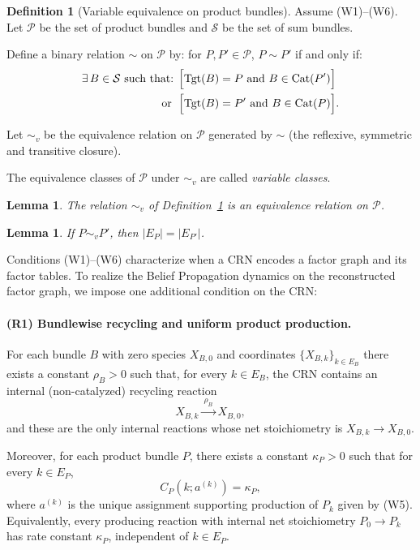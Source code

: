 \documentclass{article}
\theoremstyle{plain}
\newtheorem{lemma}[theorem]{Lemma}
\theoremstyle{definition}
\newtheorem{definition}[theorem]{Definition}
\theoremstyle{remark}
\newcommand{\Cat}{\textrm{Cat}}
\newcommand{\<}{\langle}
\newcommand{\tgt}{\textrm{Tgt}}
\renewcommand{\>}{\rangle}
\begin{document}
\begin{definition}[Variable equivalence on product bundles]\label{def:variable-equivalence}
Assume (W1)--(W6). Let $\mathcal{P}$ be the set of product bundles and 
$\mathcal{S}$ be the set of sum bundles.

Define a binary relation $\sim$ on $\mathcal{P}$ by: for $P, P' \in \mathcal{P}$,
\newline $P \sim P'$ if and only if:
\begin{align*}
    \exists\, B \in \mathcal{S} \text{ such that: } &
    \Bigl[\tgt(B) = P \text{ and } B \in \Cat(P')\Bigr]
     \\ \;\text{ or }\; &
    \Bigl[\tgt(B) = P' \text{ and } B \in \Cat(P)\Bigr].
\end{align*}

Let $\sim_v$ be the equivalence relation on $\mathcal{P}$ generated by $\sim$
(the reflexive, symmetric and transitive closure).

The equivalence classes of $\mathcal{P}$ under $\sim_v$ are called 
\emph{variable classes}.
\end{definition}

\begin{lemma}\label{lem:var-equiv}
The relation $\sim_v$ of Definition~\ref{def:variable-equivalence} is an 
equivalence relation on $\mathcal{P}$.
\end{lemma}

\begin{lemma}\label{lem:var-state-space}
If $P \sim_v P'$, then $|E_P| = |E_{P'}|$.
\end{lemma}

Conditions (W1)--(W6) characterize when a CRN encodes a factor graph and its
factor tables. To realize the Belief Propagation dynamics on the reconstructed
factor graph, we impose one additional condition on the CRN:

\paragraph{(R1) Bundlewise recycling and uniform product production.}
For each bundle $B$ with zero species $X_{B,0}$ and coordinates
$\{X_{B,k}\}_{k\in E_B}$ there exists a constant $\rho_B>0$ such that, for every
$k\in E_B$, the CRN contains an internal (non-catalyzed) recycling reaction
\[
  X_{B,k} \xrightarrow{\ \rho_B\ } X_{B,0},
\]
and these are the only internal reactions whose net stoichiometry is
$X_{B,k}\to X_{B,0}$.

Moreover, for each product bundle $P$, there exists a constant $\kappa_P>0$
such that for every $k\in E_P$,
\[
  C_P(k;a^{(k)})=\kappa_P,
\]
where $a^{(k)}$ is the unique assignment supporting production of $P_k$ given by
\textup{(W5)}.
Equivalently, every producing reaction with internal net stoichiometry $P_0\to P_k$
has rate constant $\kappa_P$, independent of $k\in E_P$.
\end{document}
